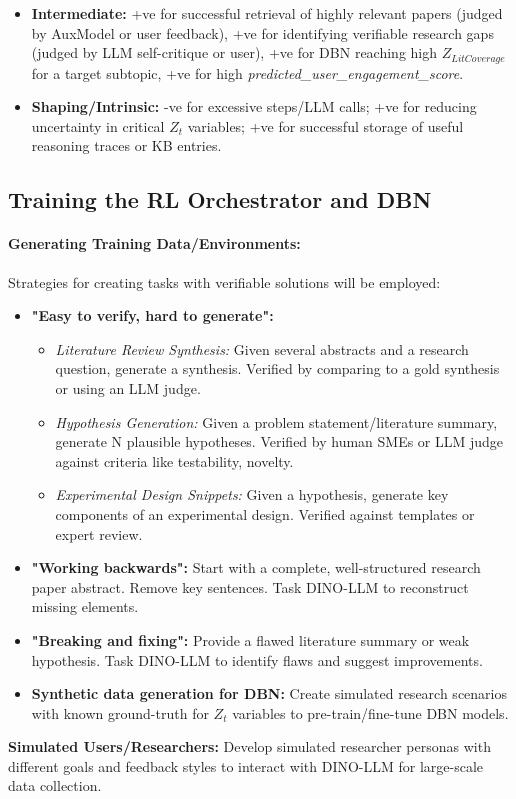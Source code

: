 \documentclass[11pt]{article}
\begin{document}
\begin{itemize}
\begin{itemize}
        \item \textbf{Intermediate:} +ve for successful retrieval of highly relevant papers (judged by AuxModel or user feedback), +ve for identifying verifiable research gaps (judged by LLM self-critique or user), +ve for DBN reaching high $Z_{LitCoverage}$ for a target subtopic, +ve for high \emph{predicted_user_engagement_score}.
        \item \textbf{Shaping/Intrinsic:} -ve for excessive steps/LLM calls; +ve for reducing uncertainty in critical $Z_t$ variables; +ve for successful storage of useful reasoning traces or KB entries.
    \end{itemize}
\end{itemize}

\subsection{Training the RL Orchestrator and DBN}
\label{ssec:case_study_training}

\paragraph{Generating Training Data/Environments:}
Strategies for creating tasks with verifiable solutions will be employed:
\begin{itemize}
    \item \textbf{"Easy to verify, hard to generate":}
    \begin{itemize}
        \item \textit{Literature Review Synthesis:} Given several abstracts and a research question, generate a synthesis. Verified by comparing to a gold synthesis or using an LLM judge.
        \item \textit{Hypothesis Generation:} Given a problem statement/literature summary, generate N plausible hypotheses. Verified by human SMEs or LLM judge against criteria like testability, novelty.
        \item \textit{Experimental Design Snippets:} Given a hypothesis, generate key components of an experimental design. Verified against templates or expert review.
    \end{itemize}
    \item \textbf{"Working backwards":} Start with a complete, well-structured research paper abstract. Remove key sentences. Task DINO-LLM to reconstruct missing elements.
    \item \textbf{"Breaking and fixing":} Provide a flawed literature summary or weak hypothesis. Task DINO-LLM to identify flaws and suggest improvements.
    \item \textbf{Synthetic data generation for DBN:} Create simulated research scenarios with known ground-truth for $Z_t$ variables to pre-train/fine-tune DBN models.
\end{itemize}
\textbf{Simulated Users/Researchers:} Develop simulated researcher personas with different goals and feedback styles to interact with DINO-LLM for large-scale data collection.
\end{document}
